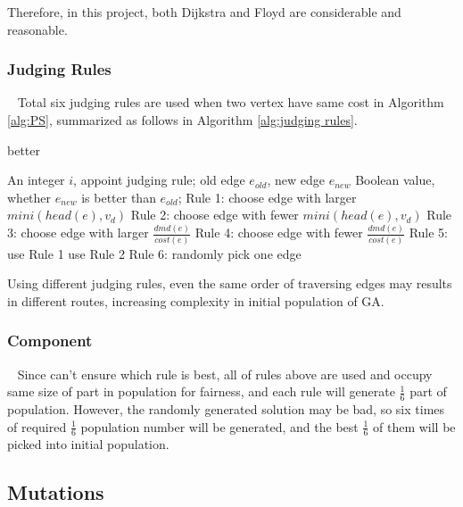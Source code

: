 \documentclass[journal]{IEEEtran}
\begin{document}
	Therefore, in this project, both Dijkstra and Floyd are considerable and reasonable.
	
	\subsubsection{Judging Rules}\label{Judging Rules}
	\ 
	\newline
	\indent
	Total six judging rules are used when two vertex have same cost in Algorithm \ref{alg:PS}, summarized as follows in Algorithm \ref{alg:judging rules}.
	
	\begin{algorithm}[htbp]
		\caption{better}\label{alg:judging rules}
		\begin{algorithmic}
			\Require An integer $i$, appoint judging rule; old edge $e_{old}$, new edge $e_{new}$
			\Ensure Boolean value, whether $e_{new}$ is better than $e_{old}$;
			\newline
			\State Rule 1: choose edge with larger $mini(head(e),v_d)$
			\State Rule 2: choose edge with fewer $mini(head(e),v_d)$
			\State Rule 3: choose edge with larger $\frac{dmd(e)}{cost(e)}$
			\State Rule 4: choose edge with fewer $\frac{dmd(e)}{cost(e)}$
			\State Rule 5: 
				\State use Rule 1
				\Else 
				\State use Rule 2
				\EndIf
			\Else
			\State Rule 6: randomly pick one edge
			\EndIf
		\end{algorithmic}
	\end{algorithm}

	Using different judging rules, even the same order of traversing edges may results in different routes, increasing complexity in initial population of GA.

	\subsubsection{Component}
	\ 
	\newline
	\indent
	Since can't ensure which rule is best, all of rules above are used and occupy same size of part in population for fairness, and each rule will generate $\frac{1}{6}$ part of population. However, the randomly generated solution may be bad, so six times of required $\frac{1}{6}$ population number will be generated, and the best $\frac{1}{6}$ of them will be picked into initial population.

	\subsection{Mutations}
	
\end{document}
